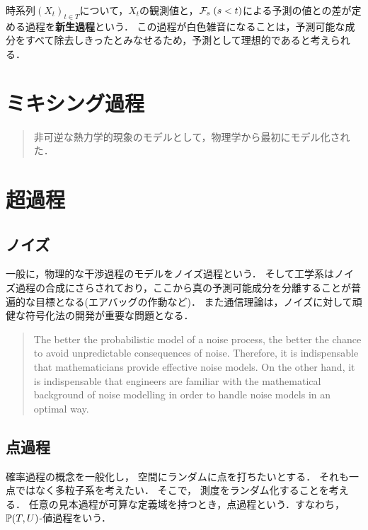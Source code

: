 \documentclass[uplatex,dvipdfmx]{jsreport}
\begin{document}
\begin{definition}
    
\end{definition}

\begin{definition}[innovation]
    時系列$(X_t)_{t\in T}$について，$X_t$の観測値と，$\mathcal{F}_s\;(s<t)$による予測の値との差が定める過程を\textbf{新生過程}という．
    この過程が白色雑音になることは，予測可能な成分をすべて除去しきったとみなせるため，予測として理想的であると考えられる．
\end{definition}

\chapter{ミキシング過程}

\begin{quotation}
    非可逆な熱力学的現象のモデルとして，物理学から最初にモデル化された．
\end{quotation}

\chapter{超過程}

\section{ノイズ}

一般に，物理的な干渉過程のモデルをノイズ過程という．
そして工学系はノイズ過程の合成にさらされており，ここから真の予測可能成分を分離することが普遍的な目標となる(エアバッグの作動など)．
また通信理論は，ノイズに対して頑健な符号化法の開発が重要な問題となる．
\begin{quote}
    The
better the probabilistic model of a noise process, the better the chance to
avoid unpredictable consequences of noise. Therefore, it is indispensable
that mathematicians provide effective noise models. On the other hand, it is
indispensable that engineers are familiar with the mathematical background
of noise modelling in order to handle noise models in an optimal way.\cite{Schaffler}
\end{quote}

\section{点過程}

\begin{tcolorbox}[colframe=ForestGreen, colback=ForestGreen!10!white,breakable,colbacktitle=ForestGreen!40!white,coltitle=black,fonttitle=\bfseries\sffamily,
title=]
    確率過程の概念を一般化し，
    空間にランダムに点を打ちたいとする．
    それも一点ではなく多粒子系を考えたい．
    そこで，
    測度をランダム化することを考える．
    任意の見本過程が可算な定義域を持つとき，点過程という．すなわち，$\mathbb{P}(T,U)$-値過程をいう．
\end{tcolorbox}
\end{document}
